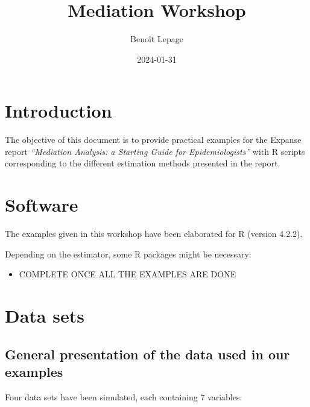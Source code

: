 \documentclass[
]{book}
\title{Mediation Workshop}
\author{Benoît Lepage}
\date{2024-01-31}
\providecommand{\tightlist}{%
  \setlength{\itemsep}{0pt}\setlength{\parskip}{0pt}}
\begin{document}
\maketitle

{
\setcounter{tocdepth}{1}
\tableofcontents
}
\hypertarget{introduction}{%
\chapter{Introduction}\label{introduction}}

The objective of this document is to provide practical examples for the Expanse report \emph{``Mediation Analysis: a Starting Guide for Epidemiologists''} with R scripts corresponding to the different estimation methods presented in the report.

\hypertarget{software}{%
\chapter{Software}\label{software}}

The examples given in this workshop have been elaborated for R (version 4.2.2).

Depending on the estimator, some R packages might be necessary:

\begin{itemize}
\tightlist
\item
  COMPLETE ONCE ALL THE EXAMPLES ARE DONE
\end{itemize}

\hypertarget{data-sets}{%
\chapter{Data sets}\label{data-sets}}

\hypertarget{general-presentation-of-the-data-used-in-our-examples}{%
\section{General presentation of the data used in our examples}\label{general-presentation-of-the-data-used-in-our-examples}}

Four data sets have been simulated, each containing 7 variables:
\end{document}
